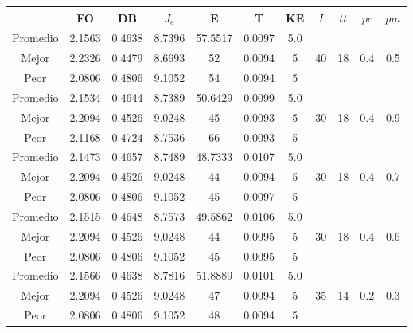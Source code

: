 \begin{table}[h!]
    \footnotesize
    \begin{center}
        \begin{tabular}{|c|c|c|c|c|c|c|c|c|c|c|}
        \hline
             & {\bf FO} & {\bf DB} & $J_e$ & {\bf E} & {\bf T} & {\bf KE} & $I$ & $tt$ & $pc$ & $pm$ \\
        \hline
        \hline
            Promedio  & 2.1563 & 0.4638 & 8.7396 & 57.5517 & 0.0097 & 5.0 &  &  &  & \\
            \cline{1-7}
            Mejor & 2.2326 & 0.4479  & 8.6693 & 52 & 0.0094 & 5 & 40 & 18 & 0.4 & 0.5\\
            \cline{1-7}
            Peor & 2.0806 & 0.4806  & 9.1052 & 54 & 0.0094 & 5 &  &  &  & \\
        \hline
        \hline
            Promedio  & 2.1534 & 0.4644 & 8.7389 & 50.6429 & 0.0099 & 5.0 &  &  &  & \\
            \cline{1-7}
            Mejor & 2.2094 & 0.4526  & 9.0248 & 45 & 0.0093 & 5 & 30 & 18 & 0.4 & 0.9\\
            \cline{1-7}
            Peor & 2.1168 & 0.4724  & 8.7536 & 66 & 0.0093 & 5 &  &  &  & \\
        \hline
        \hline
            Promedio  & 2.1473 & 0.4657 & 8.7489 & 48.7333 & 0.0107 & 5.0 &  &  &  & \\
            \cline{1-7}
            Mejor & 2.2094 & 0.4526  & 9.0248 & 44 & 0.0094 & 5 & 30 & 18 & 0.4 & 0.7\\
            \cline{1-7}
            Peor & 2.0806 & 0.4806  & 9.1052 & 45 & 0.0097 & 5 &  &  &  & \\
        \hline
        \hline
            Promedio  & 2.1515 & 0.4648 & 8.7573 & 49.5862 & 0.0106 & 5.0 &  &  &  & \\
            \cline{1-7}
            Mejor & 2.2094 & 0.4526  & 9.0248 & 44 & 0.0095 & 5 & 30 & 18 & 0.4 & 0.6\\
            \cline{1-7}
            Peor & 2.0806 & 0.4806  & 9.1052 & 45 & 0.0095 & 5 &  &  &  & \\
        \hline
        \hline
            Promedio  & 2.1566 & 0.4638 & 8.7816 & 51.8889 & 0.0101 & 5.0 &  &  &  & \\
            \cline{1-7}
            Mejor & 2.2094 & 0.4526  & 9.0248 & 47 & 0.0094 & 5 & 35 & 14 & 0.2 & 0.3\\
            \cline{1-7}
            Peor & 2.0806 & 0.4806  & 9.1052 & 48 & 0.0094 & 5 &  &  &  & \\

\end{tabular}
\end{center}
\end{table}
